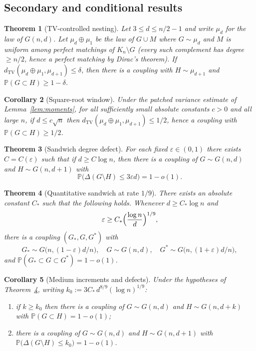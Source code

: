\documentclass[11pt]{article}
\newtheorem{theorem}{Theorem}
\newtheorem{corollary}[theorem]{Corollary}
\newcommand{\Gnd}{G(n,d)}
\newcommand{\PP}{\mathbb{P}}
\newcommand{\dTV}{d_{\mathrm{TV}}}
\begin{document}
\subsection{Secondary and conditional results}

\begin{theorem}[TV-controlled nesting]
\label{thm:approx}
Let \(3\le d\le n/2-1\) and write \(\mu_d\) for the law of \(\Gnd\).
Let \(\mu_d\oplus\mu_1\) be the law of \(G\cup M\) where \(G\sim\mu_d\) and \(M\) is
uniform among perfect matchings of \(K_n\setminus G\)
(every such complement has degree \(\ge n/2\), hence a perfect matching by Dirac's
theorem).
If \(\dTV(\mu_d\oplus\mu_1,\mu_{d+1})\le\delta\), then there is a coupling with
\(H\sim\mu_{d+1}\) and \(\PP(G\subset H)\ge 1-\delta\).
\end{theorem}

\begin{corollary}[Square-root window]
\label{cor:sqrt}
Under the patched variance estimate of Lemma~\ref{lem:moments}, for all sufficiently
small absolute constants \(c>0\) and all large \(n\), if \(d\le c\sqrt{n}\) then
\(\dTV(\mu_d\oplus\mu_1,\mu_{d+1})\le 1/2\), hence a coupling with
\(\PP(G\subset H)\ge 1/2\).
\end{corollary}

\begin{theorem}[Sandwich degree defect]
\label{thm:defect}
For each fixed \(\varepsilon\in(0,1)\) there exists \(C=C(\varepsilon)\) such that if
\(d\ge C\log n\), then there is a coupling of \(G\sim\Gnd\) and \(H\sim G(n,d+1)\) with
\[
\PP\bigl(\Delta(G\setminus H)\le 3\varepsilon d\bigr)=1-o(1).
\]
\end{theorem}

\begin{theorem}[Quantitative sandwich at rate \(1/9\)]
\label{thm:quant}
There exists an absolute constant \(C_*\) such that the following holds.
Whenever \(d\ge C_*\log n\) and
\[
\varepsilon\ge C_*\Bigl(\frac{\log n}{d}\Bigr)^{1/9},
\]
there is a coupling \((G_*,G,G^*)\) with
\[
G_*\sim G\bigl(n,(1-\varepsilon)d/n\bigr),\quad
G\sim\Gnd,\quad
G^*\sim G\bigl(n,(1+\varepsilon)d/n\bigr),
\]
and \(\PP(G_*\subset G\subset G^*)=1-o(1)\).
\end{theorem}

\begin{corollary}[Medium increments and defects]
\label{cor:quant-nest}
Under the hypotheses of Theorem~\ref{thm:quant}, writing
\(k_0:=3C_*\,d^{8/9}(\log n)^{1/9}\):
\begin{enumerate}
\item if \(k\ge k_0\) then there is a coupling of \(G\sim\Gnd\) and
\(H\sim G(n,d+k)\) with \(\PP(G\subset H)=1-o(1)\);
\item there is a coupling of \(G\sim\Gnd\) and \(H\sim G(n,d+1)\) with
\(\PP\bigl(\Delta(G\setminus H)\le k_0\bigr)=1-o(1)\).
\end{enumerate}
\end{corollary}
\end{document}
